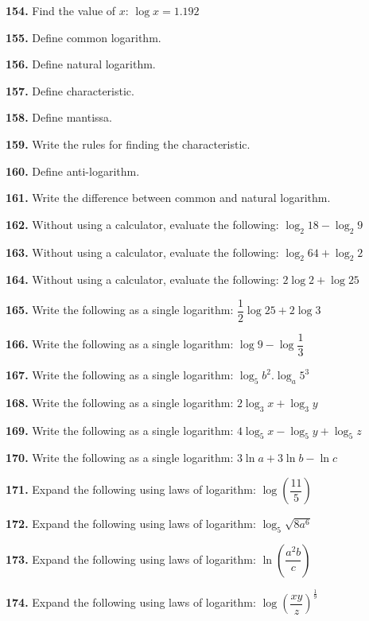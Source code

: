 \documentclass[11pt]{article}
\begin{document}
\bigskip
\noindent\textbf{154.} Find the value of $x$: $\log x = 1.192$

\bigskip
\noindent\textbf{155.} Define common logarithm.

\bigskip
\noindent\textbf{156.} Define natural logarithm.

\bigskip
\noindent\textbf{157.} Define characteristic.

\bigskip
\noindent\textbf{158.} Define mantissa.

\bigskip
\noindent\textbf{159.} Write the rules for finding the characteristic.

\bigskip
\noindent\textbf{160.} Define anti-logarithm.

\bigskip
\noindent\textbf{161.} Write the difference between common and natural logarithm.

\bigskip
\noindent\textbf{162.} Without using a calculator, evaluate the following: $\log_2 18-\log_2 9$

\bigskip
\noindent\textbf{163.} Without using a calculator, evaluate the following: $\log_2 64+\log_2 2$

\bigskip
\noindent\textbf{164.} Without using a calculator, evaluate the following: $2\log 2+\log 25$

\bigskip
\noindent\textbf{165.} Write the following as a single logarithm: $\dfrac{1}{2}\log 25 + 2\log 3$

\bigskip
\noindent\textbf{166.} Write the following as a single logarithm: $\log 9 - \log \dfrac{1}{3}$

\bigskip
\noindent\textbf{167.} Write the following as a single logarithm: $\log_5 b^2 . \log_a 5^3$

\bigskip
\noindent\textbf{168.} Write the following as a single logarithm: $2\log_3 x+\log_3 y$

\bigskip
\noindent\textbf{169.} Write the following as a single logarithm: $4\log_5 x -\log_5 y+\log_5 z$

\bigskip
\noindent\textbf{170.} Write the following as a single logarithm: $3\ln a+3\ln b - \ln c$

\bigskip
\noindent\textbf{171.} Expand the following using laws of logarithm: $\log\left(\dfrac{11}{5}\right)$

\bigskip
\noindent\textbf{172.} Expand the following using laws of logarithm: $\log_5 \sqrt{8a^6}$

\bigskip
\noindent\textbf{173.} Expand the following using laws of logarithm: $\ln\left(\dfrac{a^2b}{c}\right)$

\bigskip
\noindent\textbf{174.} Expand the following using laws of logarithm: $\log\left(\dfrac{xy}{z}\right)^{\frac{1}{9}}$
\end{document}
